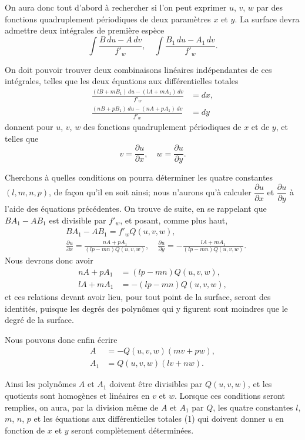 \documentclass{article}
\begin{document}
On aura donc tout d'abord à rechercher si l'on peut exprimer $u$, $v$, $w$ par des fonctions quadruplement périodiques de deux paramètres $x$ et $y$. La surface devra admettre deux intégrales de première espèce
\[
\int \frac{B\,du - A\,dv}{f'_{w}}, \quad \int \frac{B_{1}\,du - A_{1}\,dv}{f'_{w}}.
\]

On doit pouvoir trouver deux combinaisons linéaires indépendantes de ces intégrales, telles que les deux équations aux différentielles totales
\[
\begin{aligned}
\frac{(lB + mB_{1})\,du - (lA + mA_{1})\,dv}{f'_{w}} &= dx, \\
\frac{(nB + pB_{1})\,du - (nA + pA_{1})\,dv}{f'_{w}} &= dy
\end{aligned}
\tag{1}
\]
donnent pour $u$, $v$, $w$ des fonctions quadruplement périodiques de $x$ et de $y$, et telles que
\[
v = \frac{\partial u}{\partial x}, \quad w = \frac{\partial u}{\partial y}.
\]

Cherchons à quelles conditions on pourra déterminer les quatre constantes $(l, m, n, p)$, de façon qu'il en soit ainsi; nous n'aurons qu'à calculer $\dfrac{\partial u}{\partial x}$ et $\dfrac{\partial u}{\partial y}$ à l'aide des équations précédentes. On trouve de suite, en se rappelant que $BA_{1} - AB_{1}$ est divisible par $f'_{w}$, et posant, comme plus haut,
\[
\begin{aligned}
&BA_{1} - AB_{1} = f'_{w}Q(u, v, w), \\
&\frac{\partial u}{\partial x} = \frac{nA + pA_{1}}{(lp - mn)Q(u, v, w)}, \quad \frac{\partial u}{\partial y} = -\frac{lA + mA_{1}}{(lp - mn)Q(u, v, w)}.
\end{aligned}
\]
Nous devrons donc avoir
\[
\begin{aligned}
nA + pA_{1} &= (lp - mn)Q(u, v, w), \\
lA + mA_{1} &= -(lp - mn)Q(u, v, w),
\end{aligned}
\]
et ces relations devant avoir lieu, pour tout point de la surface, seront des identités, puisque les degrés des polynômes qui y figurent sont moindres que le degré de la surface.

Nous pouvons donc enfin écrire
\[
\begin{aligned}
A &= -Q(u, v, w)(mv + pw), \\
A_{1} &= Q(u, v, w)(lv + nw).
\end{aligned}
\]

Ainsi les polynômes $A$ et $A_{1}$ doivent être divisibles par $Q(u, v, w)$, et les quotients sont homogènes et linéaires en $v$ et $w$. Lorsque ces conditions seront remplies, on aura, par la division même de $A$ et $A_{1}$ par $Q$, les quatre constantes $l$, $m$, $n$, $p$ et les équations aux différentielles totales (1) qui doivent donner $u$ en fonction de $x$ et $y$ seront complètement déterminées.
\end{document}
